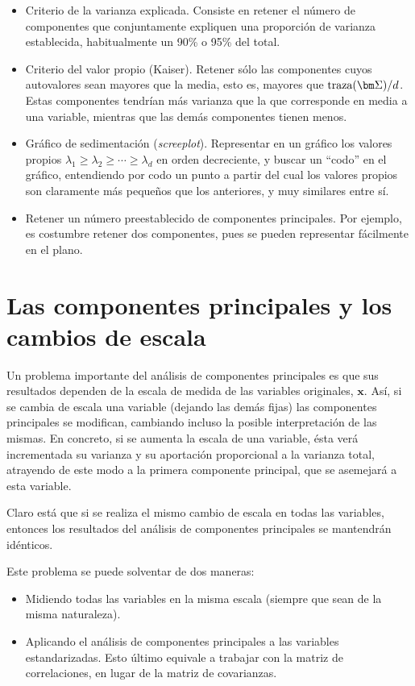 \documentclass[
  a4paper,
  oneside]{scrbook}
\theoremstyle{definition}
\theoremstyle{definition}
\theoremstyle{definition}
\theoremstyle{definition}
\theoremstyle{remark}
\begin{document}
\begin{itemize}
\item
  Criterio de la varianza explicada. Consiste en retener el número de
  componentes que conjuntamente expliquen una proporción de varianza
  establecida, habitualmente un 90\% o 95\% del total.
\item
  Criterio del valor propio (Kaiser). Retener sólo las componentes
  cuyos autovalores sean mayores que la media, esto es, mayores que
  \(\textnormal{traza}(\bm\Sigma)/d\). Estas componentes tendrían más
  varianza que la que corresponde en media a una variable, mientras
  que las demás componentes tienen menos.
\item
  Gráfico de sedimentación (\emph{screeplot}). Representar en un gráfico
  los valores propios \(\lambda_1\geq \lambda_2\geq\cdots\geq\lambda_d\)
  en orden decreciente, y buscar un ``codo'' en el gráfico, entendiendo
  por codo un punto a partir del cual los valores propios son
  claramente más pequeños que los anteriores, y muy similares entre
  sí.
\item
  Retener un número preestablecido de componentes principales. Por
  ejemplo, es costumbre retener dos componentes, pues se pueden
  representar fácilmente en el plano.
\end{itemize}

\section{Las componentes principales y los cambios de escala}\label{las-componentes-principales-y-los-cambios-de-escala}

Un problema importante del análisis de componentes principales es que
sus resultados dependen de la escala de medida de las variables
originales, \(\bm{x}\). Así, si se cambia de escala una variable (dejando
las demás fijas) las componentes principales se modifican, cambiando
incluso la posible interpretación de las mismas. En concreto, si se
aumenta la escala de una variable, ésta verá incrementada su varianza y
su aportación proporcional a la varianza total, atrayendo de este modo a
la primera componente principal, que se asemejará a esta variable.

Claro está que si se realiza el mismo cambio de escala en todas las
variables, entonces los resultados del análisis de componentes
principales se mantendrán idénticos.

Este problema se puede solventar de dos maneras:

\begin{itemize}
\item
  Midiendo todas las variables en la misma escala (siempre que sean de
  la misma naturaleza).
\item
  Aplicando el análisis de componentes principales a las variables
  estandarizadas. Esto último equivale a trabajar con la matriz de
  correlaciones, en lugar de la matriz de covarianzas.
\end{itemize}
\end{document}
